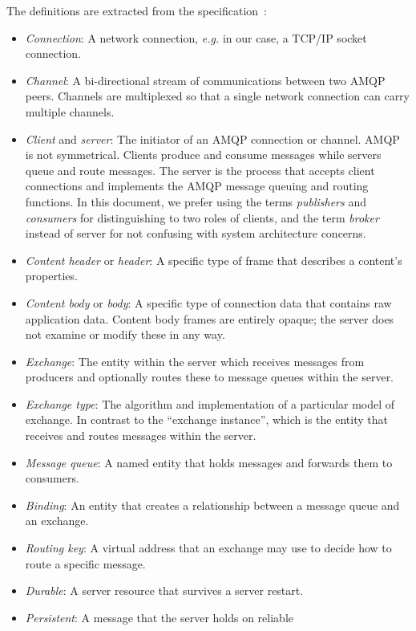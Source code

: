 The definitions are extracted from the specification~\cite{amqp}:
\begin{itemize}
\item \textit{Connection}: A network connection, \textit{e.g.} in our case, a
  TCP/IP socket connection.
\item \textit{Channel}: A bi-directional stream of communications between two
  AMQP peers. Channels are multiplexed so that a single network
  connection can carry multiple channels.
\item \textit{Client} and \textit{server}: The initiator of an AMQP
  connection or channel. AMQP is not symmetrical. Clients produce and
  consume messages while servers queue and route messages. The server
  is the process that accepts client connections and implements the
  AMQP message queuing and routing functions. In this document, we
  prefer using the terms \textit{publishers} and \textit{consumers}
  for distinguishing to two roles of clients, and the term
  \textit{broker} instead of server for not confusing with system
  architecture concerns.
\item \textit{Content header} or \textit{header}: A specific type of
  frame that describes a content's properties.
\item \textit{Content body} or \textit{body}: A specific type of
  connection data that contains raw application data. Content body
  frames are entirely opaque; the server does not examine or modify
  these in any way.
\item \textit{Exchange}: The entity within the server which receives
  messages from producers and optionally routes these to
  message queues within the server.
\item \textit{Exchange type}: The algorithm and implementation of a
  particular model of exchange. In contrast to the ``exchange
  instance'', which is the entity that receives and routes messages
  within the server.
\item \textit{Message queue}: A named entity that holds messages and
  forwards them to consumers.
\item \textit{Binding}: An entity that creates a relationship between
  a message queue and an exchange.
\item \textit{Routing key}: A virtual address that an exchange may use
  to decide how to route a specific message.
\item \textit{Durable}: A server resource that survives a server
  restart.
\item \textit{Persistent}: A message that the server holds on reliable

\end{itemize}
